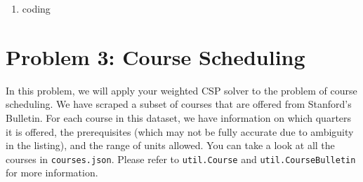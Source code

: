 \documentclass[10pt]{article}
\begin{document}
\begin{enumerate}[label=(\alph*)]
\begin{center}
	\end{center}
  
  \item coding

\end{enumerate}

\section*{\normalsize Problem 3: Course Scheduling}

In this problem, we will apply your weighted CSP solver to the problem of course scheduling. We have scraped a subset of courses that are offered from Stanford's Bulletin. For each course in this dataset, we have information on which quarters it is offered, the prerequisites (which may not be fully accurate due to ambiguity in the listing), and the range of units allowed. You can take a look at all the courses in \texttt{courses.json}. Please refer to \texttt{util.Course} and \texttt{util.CourseBulletin} for more information. 
\end{document}
